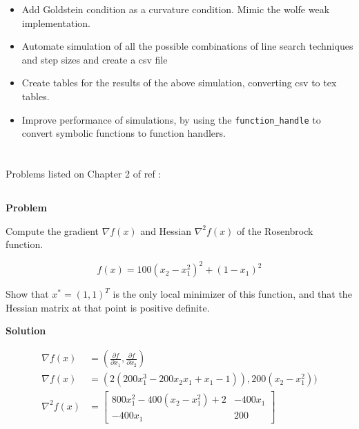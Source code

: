 \documentclass[a4paper,11pt]{article}
\numberwithin{equation}{section} %
\begin{document}
\begin{itemize}
\begin{itemize}
        \item Add Goldstein condition as a curvature condition. Mimic the wolfe weak implementation.
        \item Automate simulation of all the possible combinations of line search techniques and step sizes and create a csv file
        \item Create tables for the results of the above simulation, converting csv to tex tables.
        \item Improve performance of simulations, by using the \verb|function_handle| to convert symbolic functions to function handlers.
    \end{itemize}
\end{itemize}
 
\pagebreak

\section{}

Problems listed on Chapter 2 of ref \cite{nocedal1999numerical}:

\label{rosenbrock}
\subsection{}

\textbf{Problem}

Compute the gradient $\nabla f(x)$ and Hessian $\nabla^2 f(x)$ of the Rosenbrock function.

\begin{equation}
    f(x) = 100(x_2 -x_1^2)^2 + (1-x_1)^2 
\end{equation}

Show that $x^{\ast} = (1, 1)^{T}$ is the only local minimizer of this function, and that the Hessian matrix at that point is positive definite.


\textbf{Solution}

\begin{align}
    \nabla f(x) &= (\frac{\partial f}{\partial x_1}, \frac{\partial f}{\partial x_2}) \\
    \nabla f(x) &= (2(200x_1^3 -200x_2x_1 + x_1- 1)), 200(x_2 - x_1^2)) \\
    \nabla^2 f(x) &= 
    \begin{bmatrix}
    800x_1^2 - 400(x_2 - x_1^2) +2 & -400x_1 \\
    -400x_1 & 200
    \end{bmatrix}
\end{align}
\end{document}
